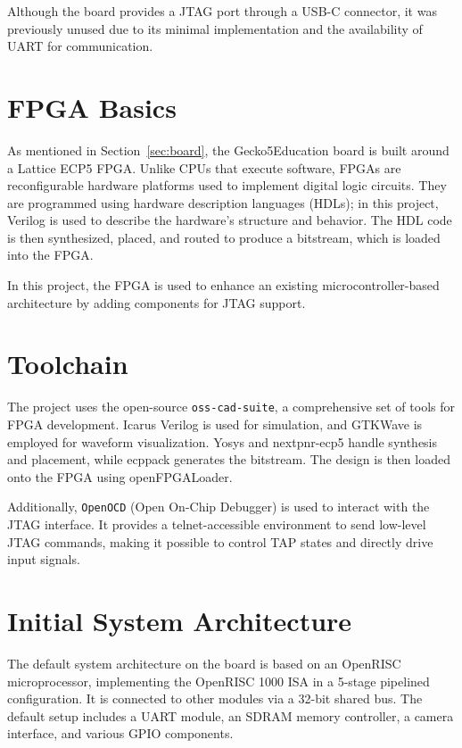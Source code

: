 \documentclass[a4paper,11pt,oneside]{report}
\newcommand{\boardName}{Gecko5Education \xspace}
\begin{document}
Although the board provides a JTAG port through a USB-C connector,  
it was previously unused due to its minimal implementation and  
the availability of UART for communication.  

\section{FPGA Basics}

As mentioned in Section~\ref{sec:board}, the \boardName board is built around a Lattice ECP5 FPGA.  
Unlike CPUs that execute software, FPGAs are reconfigurable hardware platforms  
used to implement digital logic circuits.  
They are programmed using hardware description languages (HDLs);  
in this project, Verilog is used to describe the hardware's structure and behavior.  
The HDL code is then synthesized, placed, and routed to produce a bitstream,  
which is loaded into the FPGA.  

In this project, the FPGA is used to enhance an existing microcontroller-based architecture  
by adding components for JTAG support.  

\section{Toolchain}
\label{sec:toolchain}

The project uses the open-source \texttt{oss-cad-suite},  
a comprehensive set of tools for FPGA development.  
Icarus Verilog is used for simulation,  
and GTKWave is employed for waveform visualization.  
Yosys and nextpnr-ecp5 handle synthesis and placement,  
while ecppack generates the bitstream.  
The design is then loaded onto the FPGA using openFPGALoader.  

Additionally, \texttt{OpenOCD} (Open On-Chip Debugger) is used  
to interact with the JTAG interface.  
It provides a telnet-accessible environment to send low-level JTAG commands,  
making it possible to control TAP states and directly drive input signals.  

\section{Initial System Architecture}
\label{sec:arch}

The default system architecture on the board is based on an OpenRISC microprocessor,  
implementing the OpenRISC 1000 ISA in a 5-stage pipelined configuration.  
It is connected to other modules via a 32-bit shared bus.  
The default setup includes a UART module, an SDRAM memory controller,  
a camera interface, and various GPIO components.  
\end{document}
